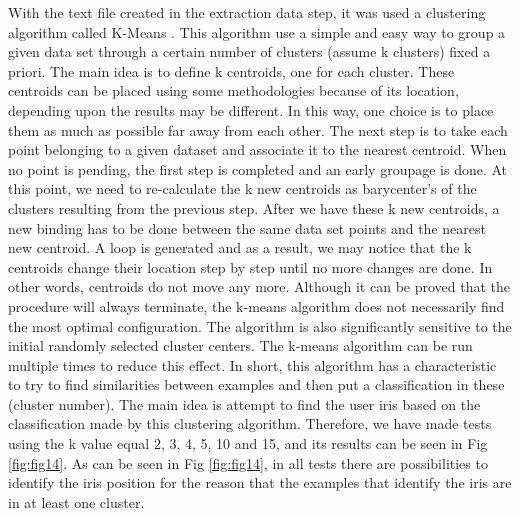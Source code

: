 \documentclass[10pt, conference]{IEEEtran}
\begin{document}
	With the text file created in the extraction data step, it was used a clustering algorithm called K-Means \cite{13}. 
	This algorithm use a simple and easy way to group a given data set through a certain number of clusters (assume k clusters) fixed a priori. 
	The main idea is to define k centroids, one for each cluster. 
	These centroids can be placed using some methodologies because of its location, depending upon the results may be different. 
	In this way, one choice is to place them as much as possible far away from each other. 
	The next step is to take each point belonging to a given dataset and associate it to the nearest centroid. 
    When no point is pending, the first step is completed and an early groupage is done. 
	At this point, we need to re-calculate the k new centroids as barycenter’s of the clusters resulting from the previous step. 
	After we have these k new centroids, a new binding has to be done between the same data set points and the nearest new centroid. 
	A loop is generated and as a result, we may notice that the k centroids change their location step by step until no more changes are done. 
	In other words, centroids do not move any more.
	Although it can be proved that the procedure will always terminate, the k-means algorithm does not necessarily find the most optimal configuration. 
	The algorithm is also significantly sensitive to the initial randomly selected cluster centers. 
	The k-means algorithm can be run multiple times to reduce this effect.
	In short, this algorithm has a characteristic to try to find similarities between examples and then put a classification in these (cluster number). 
	The main idea is attempt to find the user iris based on the classification made by this clustering algorithm. 
	Therefore, we have made tests using the k value equal 2, 3, 4, 5, 10 and 15, and its results can be seen in Fig \ref{fig:fig14}.
	As can be seen in Fig \ref{fig:fig14}, in all tests there are possibilities to identify the iris position for the reason that the examples that identify the iris are in at least one cluster. 
\end{document}
